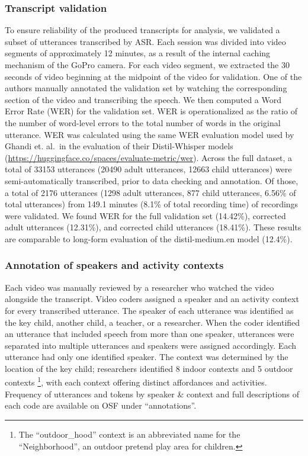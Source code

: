 \documentclass[10pt, letterpaper]{article}
\begin{document}
\hypertarget{transcript-validation}{%
\subsubsection{Transcript validation}\label{transcript-validation}}

To ensure reliability of the produced transcripts for analysis, we
validated a subset of utterances transcribed by ASR. Each session was
divided into video segments of approximately 12 minutes, as a result of
the internal caching mechanism of the GoPro camera. For each video
segment, we extracted the 30 seconds of video beginning at the midpoint
of the video for validation. One of the authors manually annotated the
validation set by watching the corresponding section of the video and
transcribing the speech. We then computed a Word Error Rate (WER) for
the validation set. WER is operationalized as the ratio of the number of
word-level errors to the total number of words in the original
utterance. WER was calculated using the same WER evaluation model used
by Ghandi et. al.~in the evaluation of their Distil-Whisper models
(\url{https://huggingface.co/spaces/evaluate-metric/wer}). Across the
full dataset, a total of 33153 utterances (20490 adult utterances, 12663
child utterances) were semi-automatically transcribed, prior to data
checking and annotation. Of those, a total of 2176 utterances (1298
adult utterances, 877 child utterances, 6.56\% of total utterances) from
149.1 minutes (8.1\% of total recording time) of recordings were
validated. We found WER for the full validation set (14.42\%), corrected
adult utterances (12.31\%), and corrected child utterances (18.41\%).
These results are comparable to long-form evaluation of the
distil-medium.en model (12.4\%).

\hypertarget{annotation-of-speakers-and-activity-contexts}{%
\subsubsection{Annotation of speakers and activity
contexts}\label{annotation-of-speakers-and-activity-contexts}}

Each video was manually reviewed by a researcher who watched the video
alongside the transcript. Video coders assigned a speaker and an
activity context for every transcribed utterance. The speaker of each
utterance was identified as the key child, another child, a teacher, or
a researcher. When the coder identified an utterance that included
speech from more than one speaker, utterances were separated into
multiple utterances and speakers were assigned accordingly. Each
utterance had only one identified speaker. The context was determined by
the location of the key child; researchers identified 8 indoor contexts
and 5 outdoor contexts \footnote{The ``outdoor\_hood'' context is an
  abbreviated name for the ``Neighborhood'', an outdoor pretend play
  area for children.}, with each context offering distinct affordances
and activities. Frequency of utterances and tokens by speaker \& context
and full descriptions of each code are available on OSF under
``annotations''.
\end{document}
